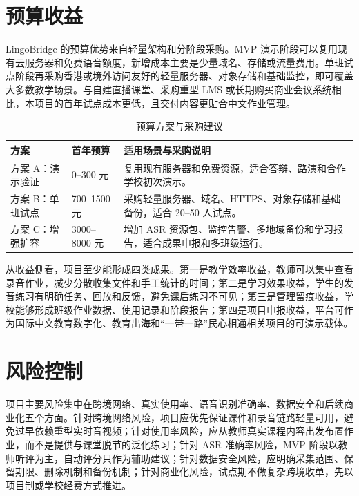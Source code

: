 \section{预算收益}
LingoBridge 的预算优势来自轻量架构和分阶段采购。MVP 演示阶段可以复用现有云服务器和免费语音额度，新增成本主要是少量域名、存储或流量费用。单班试点阶段再采购香港或境外访问友好的轻量服务器、对象存储和基础监控，即可覆盖大多数教学场景。与自建直播课堂、采购重型 LMS 或长期购买商业会议系统相比，本项目的首年试点成本更低，且交付内容更贴合中文作业管理。

\begin{table}[H]
\centering
\caption{预算方案与采购建议}
\begin{tabularx}{\textwidth}{p{2.7cm} p{2.4cm} X}
\toprule
\textbf{方案} & \textbf{首年预算} & \textbf{适用场景与采购说明} \\
\midrule
方案 A：演示验证 & 0--300 元 & 复用现有服务器和免费资源，适合答辩、路演和合作学校初次演示。 \\
方案 B：单班试点 & 700--1500 元 & 采购轻量服务器、域名、HTTPS、对象存储和基础备份，适合 20--50 人试点。 \\
方案 C：增强扩容 & 3000--8000 元 & 增加 ASR 资源包、监控告警、多地域备份和学习报告，适合成果申报和多班级运行。 \\
\bottomrule
\end{tabularx}
\end{table}

从收益侧看，项目至少能形成四类成果。第一是教学效率收益，教师可以集中查看录音作业，减少分散收集文件和手工统计的时间；第二是学习效果收益，学生的发音练习有明确任务、回放和反馈，避免课后练习不可见；第三是管理留痕收益，学校能够形成班级作业数据、使用记录和阶段报告；第四是项目申报收益，平台可作为国际中文教育数字化、教育出海和“一带一路”民心相通相关项目的可演示载体。

\section{风险控制}
项目主要风险集中在跨境网络、真实使用率、语音识别准确率、数据安全和后续商业化五个方面。针对跨境网络风险，项目应优先保证课件和录音链路轻量可用，避免过早依赖重型实时音视频；针对使用率风险，应从教师真实课程内容出发布置作业，而不是提供与课堂脱节的泛化练习；针对 ASR 准确率风险，MVP 阶段以教师听评为主，自动评分只作为辅助建议；针对数据安全风险，应明确采集范围、保留期限、删除机制和备份机制；针对商业化风险，试点期不做复杂跨境收单，先以项目制或学校经费方式推进。

